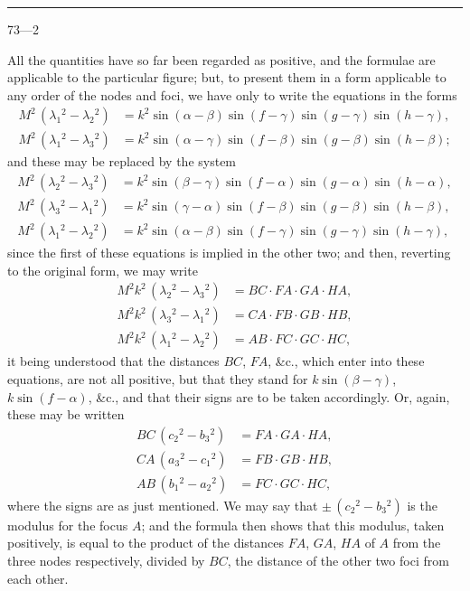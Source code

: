 \documentclass[11pt,a4paper]{book}
\begin{document}
\vspace{1ex}
\noindent\rule{2em}{0.4pt}\hfill 73---2
\newpage

\noindent
All the quantities have so far been regarded as positive, and the formulae are applicable to the particular figure; but, to present them in a form applicable to any order of the nodes and foci, we have only to write the equations in the forms
\begin{align*}
M^2\, (\lambda_1{}^{\!2} - \lambda_2{}^{\!2}) &= k^2 \sin(\alpha-\beta) \sin(f-\gamma) \sin(g-\gamma) \sin(h-\gamma), \\
M^2\, (\lambda_1{}^{\!2} - \lambda_3{}^{\!2}) &= k^2 \sin(\alpha-\gamma) \sin(f-\beta) \sin(g-\beta) \sin(h-\beta);
\end{align*}
and these may be replaced by the system
\begin{align*}
M^2\, (\lambda_2{}^{\!2} - \lambda_3{}^{\!2}) &= k^2 \sin(\beta-\gamma) \sin(f-\alpha) \sin(g-\alpha) \sin(h-\alpha), \\
M^2\, (\lambda_3{}^{\!2} - \lambda_1{}^{\!2}) &= k^2 \sin(\gamma-\alpha) \sin(f-\beta) \sin(g-\beta) \sin(h-\beta), \\
M^2\, (\lambda_1{}^{\!2} - \lambda_2{}^{\!2}) &= k^2 \sin(\alpha-\beta) \sin(f-\gamma) \sin(g-\gamma) \sin(h-\gamma),
\end{align*}
since the first of these equations is implied in the other two; and then, reverting to the original form, we may write
\begin{align*}
M^2 k^2\, (\lambda_2{}^{\!2} - \lambda_3{}^{\!2}) &= BC \cdot FA \cdot GA \cdot HA, \\
M^2 k^2\, (\lambda_3{}^{\!2} - \lambda_1{}^{\!2}) &= CA \cdot FB \cdot GB \cdot HB, \\
M^2 k^2\, (\lambda_1{}^{\!2} - \lambda_2{}^{\!2}) &= AB \cdot FC \cdot GC \cdot HC,
\end{align*}
it being understood that the distances $BC$, $FA$, \&c., which enter into these equations, are not all positive, but that they stand for $k\sin(\beta-\gamma)$, $k\sin(f-\alpha)$, \&c., and that their signs are to be taken accordingly. Or, again, these may be written
\begin{align*}
BC\, (c_2{}^{\!2} - b_3{}^{\!2}) &= FA \cdot GA \cdot HA, \\
CA\, (a_3{}^{\!2} - c_1{}^{\!2}) &= FB \cdot GB \cdot HB, \\
AB\, (b_1{}^{\!2} - a_2{}^{\!2}) &= FC \cdot GC \cdot HC,
\end{align*}
where the signs are as just mentioned. We may say that $\pm\,(c_2{}^{\!2}-b_3{}^{\!2})$ is the modulus for the focus $A$; and the formula then shows that this modulus, taken positively, is equal to the product of the distances $FA$, $GA$, $HA$ of $A$ from the three nodes respectively, divided by $BC$, the distance of the other two foci from each other.
\end{document}
